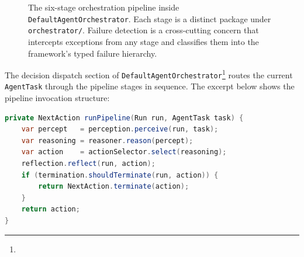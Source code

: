 \begin{figure}[h]
\centering
{}
\caption{The six-stage orchestration pipeline inside
  \texttt{DefaultAgentOrchestrator}. Each stage is a distinct package under
  \texttt{orchestrator/}. Failure detection is a cross-cutting concern that
  intercepts exceptions from any stage and classifies them into the framework's
  typed failure hierarchy.}
\label{fig:orchestration-pipeline}
\end{figure}

The decision dispatch section of
\texttt{DefaultAgentOrchestrator}\footnote{}
routes the current \texttt{AgentTask} through the pipeline stages in sequence.
The excerpt below shows the pipeline invocation structure:

\begin{lstlisting}[language=Java,caption={Pipeline invocation in \texttt{orchestrator/DefaultAgentOrchestrator.java}},label={lst:pipeline}]
% Source: orchestrator/DefaultAgentOrchestrator.java
private NextAction runPipeline(Run run, AgentTask task) {
    var percept   = perception.perceive(run, task);
    var reasoning = reasoner.reason(percept);
    var action    = actionSelector.select(reasoning);
    reflection.reflect(run, action);
    if (termination.shouldTerminate(run, action)) {
        return NextAction.terminate(action);
    }
    return action;
}
\end{lstlisting}

